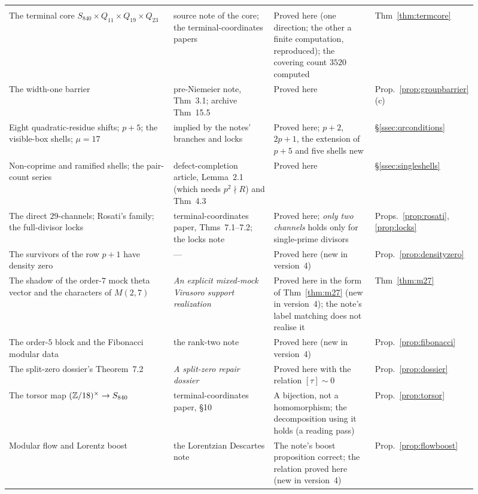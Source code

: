 \begin{center}
\begin{longtable}{@{}>{\raggedright\arraybackslash}p{0.36\linewidth}>{\raggedright\arraybackslash}p{0.22\linewidth}>{\raggedright\arraybackslash}p{0.22\linewidth}>{\raggedright\arraybackslash}p{0.11\linewidth}@{}}
\midrule
\multicolumn{4}{@{}l}{\emph{The author's notes (Section~\ref{sec:notes})}}\\*
The terminal core $S_{840}\times Q_{11}\times Q_{19}\times Q_{23}$ & source note of the core; the terminal-coordinates papers & Proved here (one direction; the other a finite computation, reproduced); the covering count $3520$ computed & Thm~\ref{thm:termcore}\\
The width-one barrier & pre-Niemeier note, Thm~3.1; archive Thm~15.5 & Proved here & Prop.~\ref{prop:groupbarrier}(c)\\
Eight quadratic-residue shifts; $p+5$; the visible-box shells; $\mu=17$ & implied by the notes' branches and locks & Proved here; $p+2$, $2p+1$, the extension of $p+5$ and five shells new & §\ref{ssec:qrconditions}\\
Non-coprime and ramified shells; the pair-count series & defect-completion article, Lemma~2.1 (which needs $p^2\nmid R$) and Thm~4.3 & Proved here & §\ref{ssec:singleshells}\\
The direct $29$-channels; Rosati's family; the full-divisor locks & terminal-coordinates paper, Thms~7.1--7.2; the locks note & Proved here; \emph{only two channels} holds only for single-prime divisors & Props.~\ref{prop:rosati}, \ref{prop:locks}\\
The survivors of the row $p+1$ have density zero & --- & Proved here (new in version~4) & Prop.~\ref{prop:densityzero}\\
The shadow of the order-$7$ mock theta vector and the characters of $M(2,7)$ & \emph{An explicit mixed-mock Virasoro support realization} & Proved here in the form of Thm~\ref{thm:m27} (new in version~4); the note's label matching does not realise it & Thm~\ref{thm:m27}\\
The order-$5$ block and the Fibonacci modular data & the rank-two note & Proved here (new in version~4) & Prop.~\ref{prop:fibonacci}\\
The split-zero dossier's Theorem~7.2 & \emph{A split-zero repair dossier} & Proved here with the relation $[\tau]\sim0$ & Prop.~\ref{prop:dossier}\\
The torsor map $(\mathbb{Z}/18)^\times\to S_{840}$ & terminal-coordinates paper, §10 & A bijection, not a homomorphism; the decomposition using it holds (a reading pass) & Prop.~\ref{prop:torsor}\\
Modular flow and Lorentz boost & the Lorentzian Descartes note & The note's boost proposition correct; the relation proved here (new in version~4) & Prop.~\ref{prop:flowboost}\\

\end{longtable}
\end{center}
